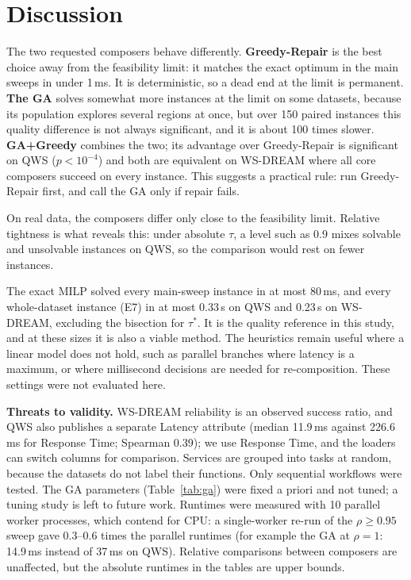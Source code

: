 \documentclass[conference]{IEEEtran}
\begin{document}
\begin{table}[t]
\centering
\caption{Success Rate at $\rho=1$ with Skewed Utility Weights (E9, 30 Instances). GR = Greedy-Repair, G+G = GA+Greedy; $w_X=.7$ Means Attribute $X$ Has Weight 0.7 and the Other 0.3}\label{tab:weights}
\resizebox{\columnwidth}{!}{}
\end{table}

\section{Discussion}\label{sec:discussion}
The two requested composers behave differently. \textbf{Greedy-Repair} is the best choice away from the feasibility limit: it matches the exact optimum in the main sweeps in under 1\,ms. It is deterministic, so a dead end at the limit is permanent. \textbf{The GA} solves somewhat more instances at the limit on some datasets, because its population explores several regions at once, but over 150 paired instances this quality difference is not always significant, and it is about 100 times slower. \textbf{GA+Greedy} combines the two; its advantage over Greedy-Repair is significant on QWS ($p<10^{-4}$) and both are equivalent on WS-DREAM where all core composers succeed on every instance. This suggests a practical rule: run Greedy-Repair first, and call the GA only if repair fails.

On real data, the composers differ only close to the feasibility limit. Relative tightness is what reveals this: under absolute $\tau$, a level such as 0.9 mixes solvable and unsolvable instances on QWS, so the comparison would rest on fewer instances.

The exact MILP solved every main-sweep instance in at most 80\,ms, and every whole-dataset instance (E7) in at most 0.33\,s on QWS and 0.23\,s on WS-DREAM, excluding the bisection for $\tau^{*}$. It is the quality reference in this study, and at these sizes it is also a viable method. The heuristics remain useful where a linear model does not hold, such as parallel branches where latency is a maximum, or where millisecond decisions are needed for re-composition. These settings were not evaluated here.

\textbf{Threats to validity.} WS-DREAM reliability is an observed success ratio, and QWS also publishes a separate Latency attribute (median 11.9\,ms against 226.6\,ms for Response Time; Spearman 0.39); we use Response Time, and the loaders can switch columns for comparison. Services are grouped into tasks at random, because the datasets do not label their functions. Only sequential workflows were tested. The GA parameters (Table~\ref{tab:ga}) were fixed a priori and not tuned; a tuning study is left to future work. Runtimes were measured with 10 parallel worker processes, which contend for CPU: a single-worker re-run of the $\rho\ge0.95$ sweep gave 0.3--0.6 times the parallel runtimes (for example the GA at $\rho=1$: 14.9\,ms instead of 37\,ms on QWS). Relative comparisons between composers are unaffected, but the absolute runtimes in the tables are upper bounds.
\end{document}
